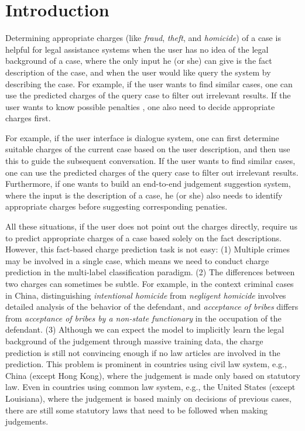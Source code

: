 \section{Introduction}
Determining appropriate charges (like \emph{fraud}, \emph{theft}, and \emph{homicide}) of a case is helpful for legal assistance systems when the user has no idea of the legal background of a case, where the only input he (or she) can give is the fact description of the case, and when the user would like query the system by describing the case.
For example, if the user wants to find similar cases, one can use the predicted charges of the query case to filter out irrelevant results. If the user wants to know possible penalties , one also need to decide appropriate charges first.


For example, if the user interface is dialogue system, one can first determine suitable charges of the current case based on the user description, and then use this to guide the subsequent conversation. If the user wants to find similar cases, one can use the predicted charges of the query case to filter out irrelevant results. Furthermore, if one wants to build an end-to-end judgement suggestion system, where the input is the description of a case, he (or she) also needs to identify appropriate charges before suggesting corresponding penaties.

All these situations, if the user does not point out the charges directly, require us to predict appropriate charges of a case based solely on the fact descriptions. However, this fact-based charge prediction task is not easy:
(1) Multiple crimes may be involved in a single case, which means we need to conduct charge prediction in the multi-label classification paradigm. 
(2) The differences between two charges can sometimes be subtle. For example, in the context criminal cases in China, distinguishing \emph{intentional homicide} from \emph{negligent homicide} involves detailed analysis of the behavior of the defendant, and \emph{acceptance of bribes} differs from \emph{acceptance of bribes by a non-state functionary} in the occupation of the defendant. 
(3)  Although we can expect the model to implicitly learn the legal background of the judgement through massive training data, the charge prediction is still not convincing enough if no law articles are involved in the prediction. This problem is prominent in countries using civil law system, e.g., China (except Hong Kong), where the judgement is made only based on statutory law. Even in countries using common law system, e.g., the United States (except Louisiana), where the judgement is based mainly on decisions of previous cases, there are still some statutory laws that need to be followed when making judgements. 

